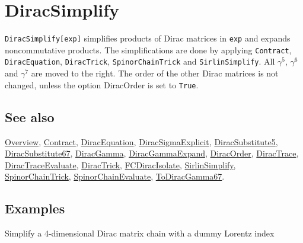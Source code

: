 \documentclass[../FeynCalcManual.tex]{subfiles}
\begin{document}
\hypertarget{diracsimplify}{%
\section{DiracSimplify}\label{diracsimplify}}

\texttt{DiracSimplify[\allowbreak{}exp]} simplifies products of Dirac
matrices in \texttt{exp} and expands noncommutative products. The
simplifications are done by applying \texttt{Contract},
\texttt{DiracEquation}, \texttt{DiracTrick}, \texttt{SpinorChainTrick}
and \texttt{SirlinSimplify}. All \(\gamma^5\), \(\gamma^6\) and
\(\gamma^7\) are moved to the right. The order of the other Dirac
matrices is not changed, unless the option DiracOrder is set to
\texttt{True}.

\subsection{See also}

\hyperlink{toc}{Overview}, \hyperlink{contract}{Contract},
\hyperlink{diracequation}{DiracEquation},
\hyperlink{diracsigmaexplicit}{DiracSigmaExplicit},
\hyperlink{diracsubstitute5}{DiracSubstitute5},
\hyperlink{diracsubstitute67}{DiracSubstitute67},
\hyperlink{diracgamma}{DiracGamma},
\hyperlink{diracgammaexpand}{DiracGammaExpand},
\hyperlink{diracorder}{DiracOrder}, \hyperlink{diractrace}{DiracTrace},
\hyperlink{diractraceevaluate}{DiracTraceEvaluate},
\hyperlink{diractrick}{DiracTrick},
\hyperlink{fcdiracisolate}{FCDiracIsolate},
\hyperlink{sirlinsimplify}{SirlinSimplify},
\hyperlink{spinorchaintrick}{SpinorChainTrick},
\hyperlink{spinorchainevaluate}{SpinorChainEvaluate},
\hyperlink{todiracgamma67}{ToDiracGamma67}.

\subsection{Examples}

Simplify a 4-dimensional Dirac matrix chain with a dummy Lorentz index

\begin{Shaded}
\begin{Highlighting}[]
\OperatorTok{[}\SpecialCharTok{\textbackslash{}}\OperatorTok{[}\OperatorTok{],} \SpecialCharTok{\textbackslash{}}\OperatorTok{[}\OperatorTok{],} \SpecialCharTok{\textbackslash{}}\OperatorTok{[}\OperatorTok{]]} 
 
\OperatorTok{[}\SpecialCharTok{\%}\OperatorTok{]}
\end{Highlighting}
\end{Shaded}
\end{document}
